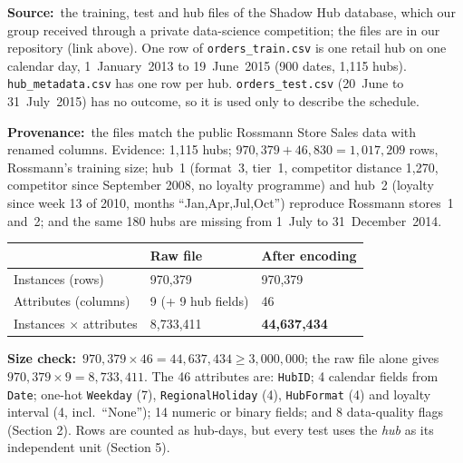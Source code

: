 \documentclass[10pt,a4paper,twocolumn]{article}
\newcommand{\key}[1]{\textbf{\textcolor{keyblue}{#1}}}
\newcommand{\field}[2]{\key{#1}~#2\par}
\newcommand{\code}[1]{\texttt{#1}}
\begin{document}
\field{Source:}{the training, test and hub files of the Shadow Hub database, which our group received through a private
data-science competition; the files are in our repository (link above). One row of \code{orders\_train.csv} is one retail hub
on one calendar day, 1~January~2013 to 19~June~2015 (900 dates, 1{,}115 hubs). \code{hub\_metadata.csv} has one row per hub.
\code{orders\_test.csv} (20~June to 31~July~2015) has no outcome, so it is used only to describe the schedule.}

\field{Provenance:}{the files match the public Rossmann Store Sales data with renamed columns. Evidence:
1{,}115 hubs; $970{,}379+46{,}830=1{,}017{,}209$ rows, Rossmann's training size; hub~1 (format~3, tier~1,
competitor distance 1{,}270, competitor since September 2008, no loyalty programme) and hub~2 (loyalty since week 13
of 2010, months ``Jan,Apr,Jul,Oct'') reproduce Rossmann stores~1 and~2; and the same 180 hubs are missing from
1~July to 31~December~2014.}

{\small
\begin{tabularx}{\linewidth}{@{}L{3.0cm} Y Y@{}}
\toprule
 & \textbf{Raw file} & \textbf{After encoding} \\
\midrule
Instances (rows) & 970{,}379 & 970{,}379 \\
Attributes (columns) & 9 (+ 9 hub fields) & 46 \\
Instances $\times$ attributes & 8{,}733{,}411 & \key{44{,}637{,}434} \\
\bottomrule
\end{tabularx}}

\field{Size check:}{\key{$970{,}379\times46=44{,}637{,}434\ge3{,}000{,}000$}; the raw file alone gives
$970{,}379\times9=8{,}733{,}411$. The 46 attributes are: \code{HubID}; 4 calendar fields from \code{Date};
one-hot \code{Weekday} (7), \code{RegionalHoliday} (4), \code{HubFormat} (4) and loyalty interval (4, incl.\ ``None'');
14 numeric or binary fields; and 8 data-quality flags (Section 2). Rows are counted as hub-days, but every test uses
the \emph{hub} as its independent unit (Section 5).}
\end{document}
